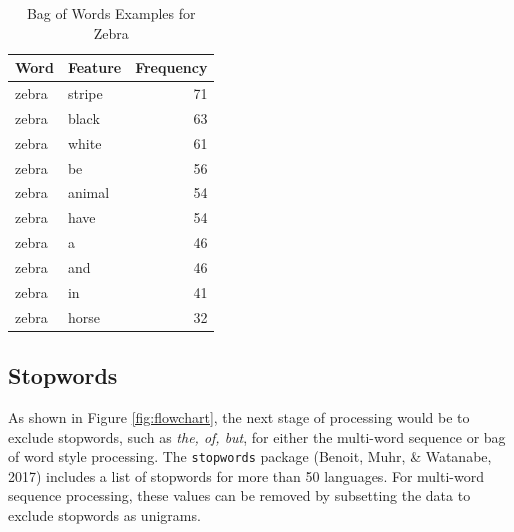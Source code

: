 \documentclass[man]{apa6}
\newenvironment{Shaded}{\begin{snugshade}}{\end{snugshade}}
\newcommand{\CommentTok}[1]{\textcolor[rgb]{0.56,0.35,0.01}{\textit{#1}}}
\newcommand{\DataTypeTok}[1]{\textcolor[rgb]{0.13,0.29,0.53}{#1}}
\newcommand{\KeywordTok}[1]{\textcolor[rgb]{0.13,0.29,0.53}{\textbf{#1}}}
\newcommand{\NormalTok}[1]{#1}
\newcommand{\OperatorTok}[1]{\textcolor[rgb]{0.81,0.36,0.00}{\textbf{#1}}}
\newcommand{\StringTok}[1]{\textcolor[rgb]{0.31,0.60,0.02}{#1}}
\begin{document}
\begin{table}[t]

\caption{\label{tab:tab5}Bag of Words Examples for Zebra}
\centering
\begin{tabular}{llr}
\toprule
Word & Feature & Frequency\\
\midrule
zebra & stripe & 71\\
zebra & black & 63\\
zebra & white & 61\\
zebra & be & 56\\
zebra & animal & 54\\
\addlinespace
zebra & have & 54\\
zebra & a & 46\\
zebra & and & 46\\
zebra & in & 41\\
zebra & horse & 32\\
\bottomrule
\end{tabular}
\end{table}

\hypertarget{stopwords}{%
\subsection{Stopwords}\label{stopwords}}

As shown in Figure \ref{fig:flowchart}, the next stage of processing would be to exclude stopwords, such as \emph{the, of, but}, for either the multi-word sequence or bag of word style processing. The \texttt{stopwords} package (Benoit, Muhr, \& Watanabe, 2017) includes a list of stopwords for more than 50 languages. For multi-word sequence processing, these values can be removed by subsetting the data to exclude stopwords as unigrams.

\scriptsize

\begin{Shaded}
\end{Shaded}
\end{document}

